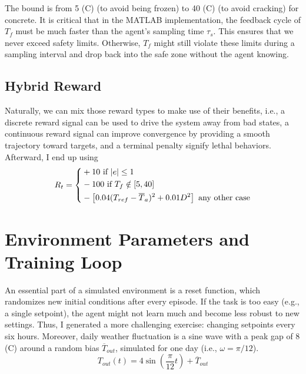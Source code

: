 \documentclass[../main.tex]{subfiles}
\begin{document}
The bound is from 5 (\degree C) (to avoid being frozen) to 40 (\degree C) (to avoid cracking) for concrete. It is critical that in the MATLAB implementation, the feedback cycle of $T_f$ must be much faster than the agent’s sampling time $\tau_s$. This ensures that we never exceed safety limits. Otherwise, $T_f$ might still violate these limits during a sampling interval and drop back into the safe zone without the agent knowing.

\subsection{Hybrid Reward}
Naturally, we can mix those reward types to make use of their benefits, i.e., a discrete reward signal can be used to drive the system away from bad states, a continuous reward signal can improve convergence by providing a smooth trajectory toward targets, and a terminal penalty signify lethal behaviors. Afterward, I end up using
\begin{equation}
    R_t = \left\{ \begin{aligned}
        &+10 \text{  if } \abs{e} \leq 1 \\
        &-100 \text{  if } T_f \notin [5,40] \\
        &- \left[ 0.04(T_{ref} - \overline{T}_a)^2 + 0.01D^2 \right] \text{  any other case}
    \end{aligned} \right.
\label{eq:final_rwd}
\end{equation}


\section{Environment Parameters and Training Loop} \label{sec:training_alg}
An essential part of a simulated environment is a reset function, which randomizes new initial conditions after every episode. If the task is too easy (e.g., a single setpoint), the agent might not learn much and become less robust to new settings. Thus, I generated a more challenging exercise: changing setpoints every six hours. Moreover, daily weather fluctuation is a sine wave with a peak gap of 8 (\degree C) around a random bias $\overline{T}_{out}$, simulated for one day (i.e., $\omega = \pi/12$).
\begin{equation}
    T_{out}(t) = 4 \sin \left( \frac{\pi}{12}t \right) + \overline{T}_{out}
\label{eq:tout}
\end{equation}
\end{document}
